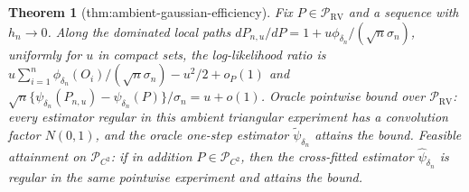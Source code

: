\documentclass{article}
\newtheorem{theorem}{Theorem}
\begin{document}
\begin{theorem}[thm:ambient-gaussian-efficiency]\label{thm:ambient-gaussian-efficiency}
Fix \(P\in\mathcal P_{\mathrm{RV}}\) and a sequence with \(h_n\to0\). Along the dominated local paths \(dP_{n,u}/dP=1+u\phi_{\delta_n}/(\sqrt n\sigma_n)\), uniformly for \(u\) in compact sets, the log-likelihood ratio is \(u\sum_{i=1}^n\phi_{\delta_n}(O_i)/(\sqrt n\sigma_n)-u^2/2+o_P(1)\) and \(\sqrt n\{\psi_{\delta_n}(P_{n,u})-\psi_{\delta_n}(P)\}/\sigma_n=u+o(1)\). Oracle pointwise bound over \(\mathcal P_{\mathrm{RV}}\): every estimator regular in this ambient triangular experiment has a convolution factor \(N(0,1)\), and the oracle one-step estimator \(\widetilde\psi_{\delta_n}\) attains the bound. Feasible attainment on \(\mathcal P_{C^2}\): if in addition \(P\in\mathcal P_{C^2}\), then the cross-fitted estimator \(\widehat\psi_{\delta_n}\) is regular in the same pointwise experiment and attains the bound.
\end{theorem}
\end{document}
